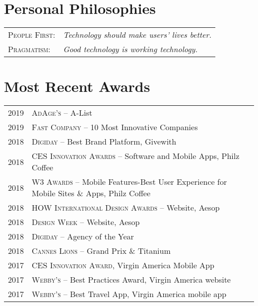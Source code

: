 \documentclass[a4paper,10pt]{article}
\begin{document}
\section{Personal Philosophies}
\begin{tabular}{ll}

  \textsc{People First:} & \emph{Technology should make users' lives
    better.} \\

  \textsc{Pragmatism:} & \emph{Good technology is working technology.}
  
\end{tabular}


\section{Most Recent Awards}
\begin{tabular}{rl}
  \textsc{2019} & \textsc{AdAge's} -- A-List \\
  \textsc{2019} & \textsc{Fast Company} -- 10 Most Innovative Companies \\
  \textsc{2018} & \textsc{Digiday} -- Best Brand Platform, Givewith \\
  \textsc{2018} & \textsc{CES Innovation Awards} -- Software and Mobile Apps, Philz Coffee \\
  \textsc{2018} & \textsc{W3 Awards} -- Mobile Features-Best User Experience for Mobile Sites \& Apps, Philz Coffee \\
  \textsc{2018} & \textsc{HOW International Design Awards} -- Website, Aesop \\
  \textsc{2018} & \textsc{Design Week} -- Website, Aesop \\
  \textsc{2018} & \textsc{Digiday} -- Agency of the Year \\
  \textsc{2018} & \textsc{Cannes Lions} -- Grand Prix \& Titanium \\
  \textsc{2017} & \textsc{CES Innovation Award}, Virgin America Mobile App \\
  \textsc{2017} & \textsc{Webby's} -- Best Practices Award, Virgin America website \\
  \textsc{2017} & \textsc{Webby's} -- Best Travel App, Virgin America mobile app \\
\end{tabular}
\end{document}
